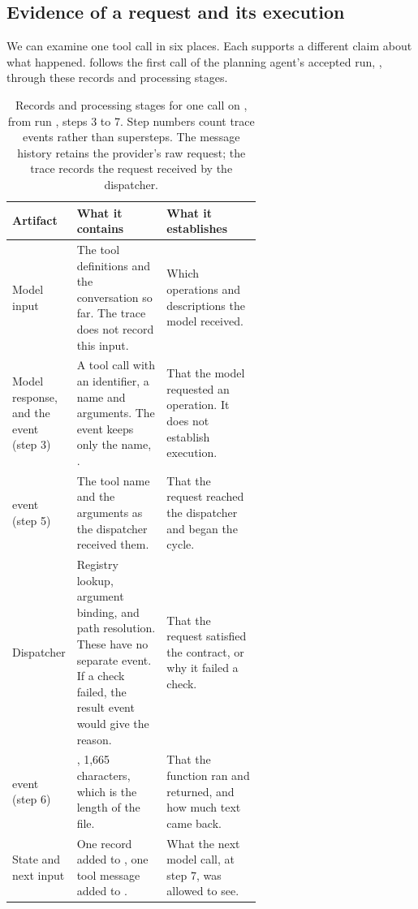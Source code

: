 \subsection{Evidence of a request and its execution}
\label{sec:boundary-artifacts}

We can examine one tool call in six places. Each supports a different claim about what happened.
 follows the first  call of the planning agent's accepted
run, , through these records and processing stages.

\begin{table}[htbp]
  \centering
  \begin{adjustbox}{width=\linewidth}\begin{tabularx}{\linewidth}{@{}L{0.25\linewidth}L{0.36\linewidth}X@{}}
    \toprule
    \textbf{Artifact} & \textbf{What it contains} & \textbf{What it establishes} \\
    \midrule
    Model input & The tool definitions and the conversation so far. The trace does not record
      this input. & Which operations and descriptions the model received. \\
    Model response, and the  event (step 3) & A tool call with an identifier, a
      name and arguments. The event keeps only the name, . & That the model
      requested an operation. It does not establish execution. \\
     event (step 5) & The tool name and the arguments as the dispatcher
      received them. & That the request reached the dispatcher and began the cycle. \\
    Dispatcher & Registry lookup, argument binding, and path resolution. These have no separate
      event. If a check failed, the result event would give the reason. & That the request satisfied the
      contract, or why it failed a check. \\
     event (step 6) & , 1,665 characters, which is the length
      of the file. & That the function ran and returned, and how much text came back. \\
    State and next input & One record added to , one tool message added
      to . & What the next model call, at step 7, was allowed to see. \\
    \bottomrule
  \end{tabularx}\end{adjustbox}
  \caption{Records and processing stages for one  call on
  , from run , steps 3 to 7. Step numbers
  count trace events rather than supersteps. The message history retains the provider's raw
  request; the trace records the request received by the dispatcher.}
  \label{tab:boundary-artifacts}
\end{table}

